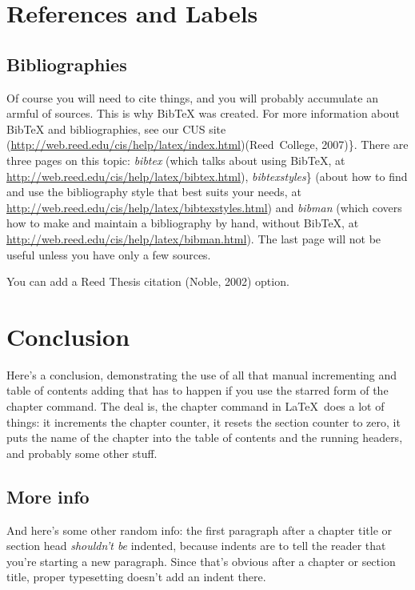 \documentclass[12pt,twoside]{reedthesis}
\begin{document}
  \chapter{References and Labels}
  
  \section{Bibliographies}\label{bibliographies}
  
  Of course you will need to cite things, and you will probably accumulate
  an armful of sources. This is why BibTeX was created. For more
  information about BibTeX and bibliographies, see our CUS site
  (\url{http://web.reed.edu/cis/help/latex/index.html})(Reed~College,
  2007)\}. There are three pages on this topic: \emph{bibtex} (which talks
  about using BibTeX, at
  \url{http://web.reed.edu/cis/help/latex/bibtex.html}),
  \emph{bibtexstyles}\} (about how to find and use the bibliography style
  that best suits your needs, at
  \url{http://web.reed.edu/cis/help/latex/bibtexstyles.html}) and
  \emph{bibman} (which covers how to make and maintain a bibliography by
  hand, without BibTeX, at
  \url{http://web.reed.edu/cis/help/latex/bibman.html}). The last page
  will not be useful unless you have only a few sources.
  
  You can add a Reed Thesis citation (Noble, 2002) option.
  
  \chapter*{Conclusion}
  
  
   
  
  Here's a conclusion, demonstrating the use of all that manual
  incrementing and table of contents adding that has to happen if you use
  the starred form of the chapter command. The deal is, the chapter
  command in \LaTeX~does a lot of things: it increments the chapter
  counter, it resets the section counter to zero, it puts the name of the
  chapter into the table of contents and the running headers, and probably
  some other stuff.
  
  \section{More info}
  
  And here's some other random info: the first paragraph after a chapter
  title or section head \emph{shouldn't be} indented, because indents are
  to tell the reader that you're starting a new paragraph. Since that's
  obvious after a chapter or section title, proper typesetting doesn't add
  an indent there.
  
\end{document}
